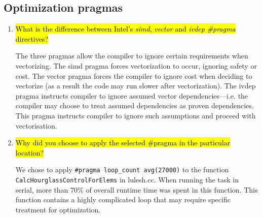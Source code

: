 \documentclass{article}
\begin{document}
\subsection{Optimization pragmas}
\begin{enumerate}
	\item \hl{What is the difference between Intel's \emph{simd}, \emph{vector} and \emph{ivdep} \emph{\#pragma} directives?}

	The three pragmas allow the compiler to ignore certain requirements when vectorizing. The simd pragma forces vectorization to occur, ignoring safety or cost. The vector pragma forces the compiler to ignore cost when deciding to vectorize (as a result the code may run slower after vectorization). The ivdep pragma instructs compiler to ignore assumed vector dependencies---i.e. the compiler may choose to treat assumed dependencies as proven dependencies. This pragma instructs compiler to ignore such assumptions and proceed with vectorisation.
	\item \hl{Why did you choose to apply the selected \#pragma in the particular location?}

	We chose to apply \verb!#pragma loop_count avg(27000)! to the function \verb!CalcHourglassControlForElems! in lulesh.cc. When running the task in serial, more than 70\% of overall runtime time was spent in this function. This function contains a highly complicated loop that may require specific treatment for optimization.
\end{enumerate}
\end{document}
